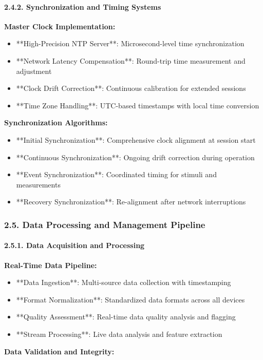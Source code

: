 \documentclass[11pt,a4paper]{article}
\begin{document}
\paragraph{2.4.2. Synchronization and Timing Systems}

\textbf{Master Clock Implementation:}

\begin{itemize}
\item **High-Precision NTP Server**: Microsecond-level time synchronization
\item **Network Latency Compensation**: Round-trip time measurement and adjustment
\item **Clock Drift Correction**: Continuous calibration for extended sessions
\item **Time Zone Handling**: UTC-based timestamps with local time conversion

\end{itemize}
\textbf{Synchronization Algorithms:}

\begin{itemize}
\item **Initial Synchronization**: Comprehensive clock alignment at session start
\item **Continuous Synchronization**: Ongoing drift correction during operation
\item **Event Synchronization**: Coordinated timing for stimuli and measurements
\item **Recovery Synchronization**: Re-alignment after network interruptions

\end{itemize}
\subsubsection{2.5. Data Processing and Management Pipeline}

\paragraph{2.5.1. Data Acquisition and Processing}

\textbf{Real-Time Data Pipeline:}

\begin{itemize}
\item **Data Ingestion**: Multi-source data collection with timestamping
\item **Format Normalization**: Standardized data formats across all devices
\item **Quality Assessment**: Real-time data quality analysis and flagging
\item **Stream Processing**: Live data analysis and feature extraction

\end{itemize}
\textbf{Data Validation and Integrity:}
\end{document}
